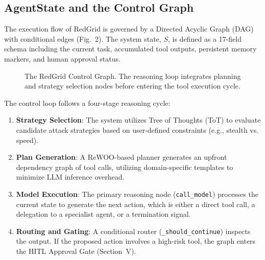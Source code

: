\documentclass[conference,compsoc]{IEEEtran}
\begin{document}
\subsection{AgentState and the Control Graph}
The execution flow of RedGrid is governed by a Directed Acyclic Graph (DAG) with conditional edges (Fig.~2). The system state, $S$, is defined as a 17-field schema including the current task, accumulated tool outputs, persistent memory markers, and human approval status.

\begin{figure}[htbp]
\centering
{}
\caption{The RedGrid Control Graph. The reasoning loop integrates planning and strategy selection nodes before entering the tool execution cycle.}
\label{fig:control}
\end{figure}

The control loop follows a four-stage reasoning cycle:
\begin{enumerate}
    \item \textbf{Strategy Selection}: The system utilizes Tree of Thoughts (ToT) to evaluate candidate attack strategies based on user-defined constraints (e.g., stealth vs. speed).
    \item \textbf{Plan Generation}: A ReWOO-based planner generates an upfront dependency graph of tool calls, utilizing domain-specific templates to minimize LLM inference overhead.
    \item \textbf{Model Execution}: The primary reasoning node (\texttt{call\_model}) processes the current state to generate the next action, which is either a direct tool call, a delegation to a specialist agent, or a termination signal.
    \item \textbf{Routing and Gating}: A conditional router (\texttt{\_should\_continue}) inspects the output. If the proposed action involves a high-risk tool, the graph enters the HITL Approval Gate (Section~V).
\end{enumerate}
\end{document}

